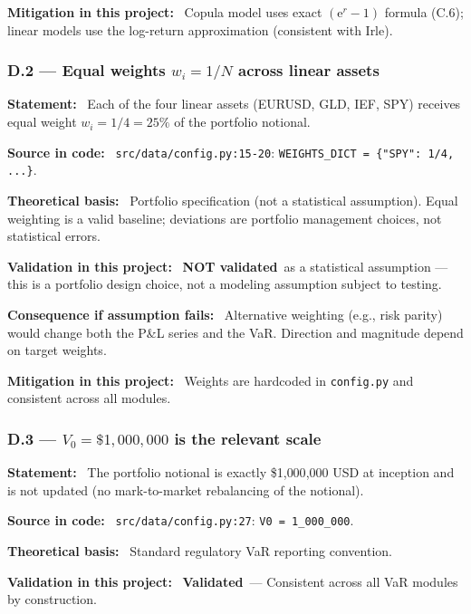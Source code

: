 \documentclass[11pt,a4paper]{article}
\newcommand{\asmfield}[1]{\medskip\noindent\textbf{#1:}\ }
\newcommand{\code}[1]{\texttt{#1}}
\newcommand{\validated}{\textbf{Validated}}
\newcommand{\notvalidated}{\textbf{NOT validated}}
\begin{document}
\asmfield{Mitigation in this project}
Copula model uses exact $(\mathrm{e}^r - 1)$ formula (C.6); linear models
use the log-return approximation (consistent with Irle).

\subsubsection{D.2 --- Equal weights $w_i = 1/N$ across linear assets}\label{asm:D2}

\asmfield{Statement}
Each of the four linear assets (EURUSD, GLD, IEF, SPY) receives equal
weight $w_i = 1/4 = 25\%$ of the portfolio notional.

\asmfield{Source in code}
\code{src/data/config.py:15-20}: \lstinline|WEIGHTS_DICT = {"SPY": 1/4, ...}|.

\asmfield{Theoretical basis}
Portfolio specification (not a statistical assumption). Equal weighting
is a valid baseline; deviations are portfolio management choices, not
statistical errors.

\asmfield{Validation in this project}
\notvalidated\ as a statistical assumption --- this is a portfolio
design choice, not a modeling assumption subject to testing.

\asmfield{Consequence if assumption fails}
Alternative weighting (e.g., risk parity) would change both the P\&L
series and the VaR. Direction and magnitude depend on target weights.

\asmfield{Mitigation in this project}
Weights are hardcoded in \code{config.py} and consistent across all modules.

\subsubsection{D.3 --- $V_0 = \$1{,}000{,}000$ is the relevant scale}\label{asm:D3}

\asmfield{Statement}
The portfolio notional is exactly \$1{,}000{,}000 USD at inception and is
not updated (no mark-to-market rebalancing of the notional).

\asmfield{Source in code}
\code{src/data/config.py:27}: \lstinline|V0 = 1_000_000|.

\asmfield{Theoretical basis}
Standard regulatory VaR reporting convention.

\asmfield{Validation in this project}
\validated\ --- Consistent across all VaR modules by construction.
\end{document}
